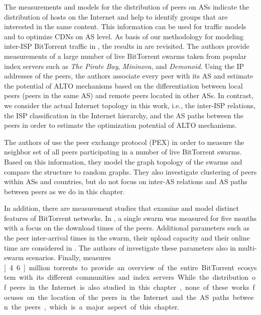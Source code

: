 The measurements and models for the distribution of peers on ASs indicate the distribution of hosts on the Internet and help to identify groups that are interested in the same content.
This information can be used for traffic models and to optimize CDNs on AS level. 
As basis of our methodology for modeling inter-ISP BitTorrent traffic in , the results in \cite{Hossfeld2011} are revisited. The authors provide measurements of a large number of live BitTorrent swarms taken from popular index servers such as \emph{The Pirate Bay}, \emph{Mininova}, and \emph{Demonoid}. Using the IP addresses of the peers, the authors associate every peer with its AS and estimate the potential of ALTO mechanisms based on the differentiation between local peers (peers in the same AS) and remote peers located in other ASs. In contrast, we consider the actual Internet topology in this work, i.e., the inter-ISP relations, the ISP classification in the Internet hierarchy, and the AS paths between the peers in order to estimate the optimization potential of ALTO mechanisms.

The authors of \cite{Kryczka2011} use the peer exchange protocol (PEX) in order to measure the neighbor set of all peers participating in a number of live BitTorrent swarms. Based on this information, they model the graph topology of the swarms and compare the structure to random graphs. They also investigate clustering of peers within ASs and countries, but do not focus on inter-AS relations and AS paths between peers as we do in this chapter.

In addition, there are measurement studies that examine and model distinct features of BitTorrent networks. In \cite{Izal2004}, a single swarm was measured for five months with a focus on the download times of the peers. Additional parameters such as the peer inter-arrival times in the swarm, their upload capacity and their online time are considered in \cite{Pouwelse2005}. The authors of \cite{Guo2005} investigate these parameters also in multi-swarm scenarios. Finally, \cite{Zhang2010} measures \unit[4.6]{million} torrents to provide an overview of the entire BitTorrent ecosystem with its different communities and index servers.
While the distribution of peers in the Internet is also studied in this chapter, none of these works focuses on the location of the peers in the Internet and the AS paths between the peers, which is a major aspect of this chapter.


